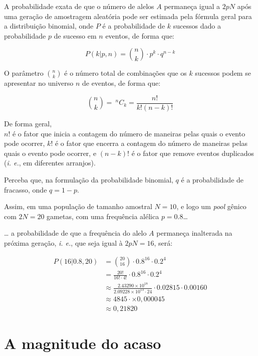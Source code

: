 \documentclass[
]{book}
\begin{document}
A probabilidade exata de que o número de alelos \(A\) permaneça igual a \(2pN\) após uma geração de amostragem aleatória pode ser estimada pela fórmula geral para a distribuição binomial, onde \(P\) é a probabilidade de \(k\) sucessos dado a probabilidade \(p\) de sucesso em \(n\) eventos, de forma que:

\begin{equation} 
  P \left( k | p, n\right) = \binom{n}{k} \cdot p^k \cdot q^{n-k}
  \label{eq:binomial}
\end{equation}

O parâmetro \(\binom{n}{k}\) é o número total de combinações que os \(k\) sucessos podem se apresentar no universo \(n\) de eventos, de forma que:

\begin{equation} 
  \binom{n}{k} = \ ^nC_k =  \frac {n!}{k! \left( n-k \right)!}
  \label{eq:combinacao}
\end{equation}

De forma geral,\\
\(n!\) é o fator que inicia a contagem do número de maneiras pelas quais o evento pode ocorrer,
\(k!\) é o fator que encerra a contagem do número de maneiras pelas quais o evento pode ocorrer, e
\(\left( n-k \right)!\) é o fator que remove eventos duplicados (\emph{i. e.}, em diferentes arranjos).

Perceba que, na formulação da probabilidade binomial, \(q\) é a probabilidade de fracasso, onde \(q = 1-p\).

Assim, em uma população de tamanho amostral \(N=10\), e logo um \emph{pool} gênico com \(2N=20\) gametas, com uma frequência alélica \(p=0.8\)\ldots{}

\ldots{} a probabilidade de que a frequência do alelo \(A\) permaneça inalterada na próxima geração, \emph{i. e.}, que seja igual à \(2pN = 16\), será:

\[
\begin{aligned}
P \left( 16 | 0.8, 20\right)
&= \binom{20}{16} \cdot 0.8^{16} \cdot0.2^{4} \\
&= \frac {20!}{16! \cdot 4!} \cdot 0.8^{16} \cdot0.2^{4}  \\
&\approx \frac {2.43290 \times 10^{18}}{2.09228 \times 10^{13} \cdot 24} \cdot 0.02815 \cdot 0.00160 \\
&\approx 4845 \cdot ×0,000045 \\
&\approx 0,21820 
\end{aligned}
\]

\hypertarget{a-magnitude-do-acaso}{%
\section{A magnitude do acaso}\label{a-magnitude-do-acaso}}
\end{document}
